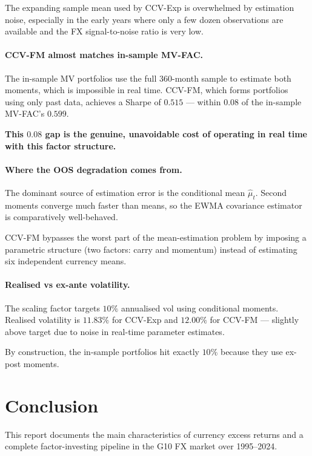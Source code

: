 \documentclass[a4paper,12pt]{article}
\begin{document}
The expanding sample mean used by CCV-Exp is overwhelmed by estimation noise, especially in
the early years where only a few dozen observations are available and the FX
signal-to-noise ratio is very low.

\paragraph{CCV-FM almost matches in-sample MV-FAC.}
The in-sample MV portfolios use the full 360-month sample to estimate both moments, which
is impossible in real time. CCV-FM, which forms portfolios using only past data, achieves
a Sharpe of $0.515$ --- within $0.08$ of the in-sample MV-FAC's $0.599$.

\textbf{This $0.08$ gap is the genuine, unavoidable cost of operating in real time with
this factor structure.}

\paragraph{Where the OOS degradation comes from.}
The dominant source of estimation error is the conditional mean $\hat{\mu}_t$. Second
moments converge much faster than means, so the EWMA covariance estimator is comparatively
well-behaved.

CCV-FM bypasses the worst part of the mean-estimation problem by imposing a parametric
structure (two factors: carry and momentum) instead of estimating six independent currency
means.

\paragraph{Realised vs ex-ante volatility.}
The scaling factor targets $10\%$ annualised vol using conditional moments. Realised
volatility is $11.83\%$ for CCV-Exp and $12.00\%$ for CCV-FM --- slightly above target due
to noise in real-time parameter estimates.

By construction, the in-sample portfolios hit exactly $10\%$ because they use ex-post
moments.

\section{Conclusion}

This report documents the main characteristics of currency excess returns and a complete
factor-investing pipeline in the G10 FX market over 1995--2024.
\end{document}
